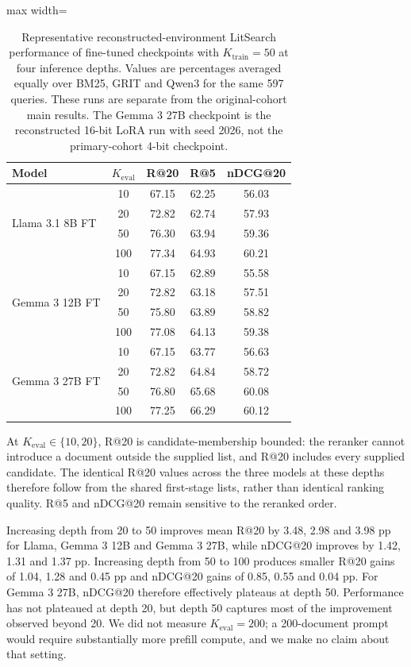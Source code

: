 \documentclass[pdflatex,sn-basic,Numbered]{sn-jnl}%
\theoremstyle{thmstyleone}%
\theoremstyle{thmstyletwo}%
\theoremstyle{thmstylethree}%
\begin{document}
\begin{table}[ht]


\centering
\footnotesize
\setlength{\tabcolsep}{4pt}
\renewcommand{\arraystretch}{1.08}
\begin{adjustbox}{max width=\linewidth}
\begin{tabular}{l c c c c}
\hline
Model & $K_{\mathrm{eval}}$ & R@20 & R@5 & nDCG@20 \\
\hline
\multirow{4}{*}{Llama 3.1 8B FT}
 & 10  & 67.15 & 62.25 & 56.03 \\
 & 20  & 72.82 & 62.74 & 57.93 \\
 & 50  & 76.30 & 63.94 & 59.36 \\
 & 100 & 77.34 & 64.93 & 60.21 \\
\hline
\multirow{4}{*}{Gemma 3 12B FT}
 & 10  & 67.15 & 62.89 & 55.58 \\
 & 20  & 72.82 & 63.18 & 57.51 \\
 & 50  & 75.80 & 63.89 & 58.82 \\
 & 100 & 77.08 & 64.13 & 59.38 \\
\hline
\multirow{4}{*}{Gemma 3 27B FT}
 & 10  & 67.15 & 63.77 & 56.63 \\
 & 20  & 72.82 & 64.84 & 58.72 \\
 & 50  & 76.80 & 65.68 & 60.08 \\
 & 100 & 77.25 & 66.29 & 60.12 \\
\hline
\end{tabular}
\end{adjustbox}


\caption{Representative reconstructed-environment LitSearch performance of fine-tuned checkpoints with $K_{\mathrm{train}}=50$ at four inference depths.
Values are percentages averaged equally over BM25, GRIT and Qwen3 for the same
597 queries. These runs are separate from the original-cohort main results. The
Gemma 3 27B checkpoint is the reconstructed 16-bit LoRA run with seed 2026, not
the primary-cohort 4-bit checkpoint.}
\label{tab:inference-depth}
\end{table}

At $K_{\mathrm{eval}}\in\{10,20\}$, R@20 is candidate-membership bounded: the
reranker cannot introduce a document outside the supplied list, and R@20 includes
every supplied candidate. The identical R@20 values across the three models at these
depths therefore follow from the shared first-stage lists, rather than identical
ranking quality. R@5 and nDCG@20 remain sensitive to the reranked order.

Increasing depth from 20 to 50 improves mean R@20 by 3.48, 2.98 and 3.98 pp for
Llama, Gemma 3 12B and Gemma 3 27B, while nDCG@20 improves by 1.42, 1.31 and
1.37 pp. Increasing depth from 50 to 100 produces smaller R@20 gains of 1.04,
1.28 and 0.45 pp and nDCG@20 gains of 0.85, 0.55 and 0.04 pp. For Gemma 3 27B,
nDCG@20 therefore effectively plateaus at depth 50. Performance has not plateaued
at depth 20, but depth 50 captures most of the improvement observed beyond 20. We
did not measure
$K_{\mathrm{eval}}=200$; a 200-document prompt would require substantially more
prefill compute, and we make no claim about that setting.
\end{document}
